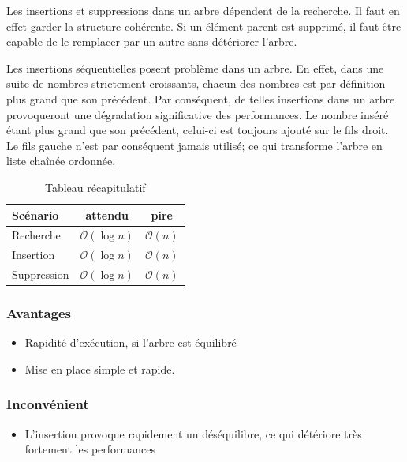 \documentclass[hidelinks,a4paper, 12pt]{article}
\begin{document}
	Les insertions et suppressions dans un arbre dépendent de la recherche. Il faut en effet garder la structure cohérente. Si un élément parent est supprimé, il faut être capable de le remplacer par un autre sans détériorer l'arbre.
	
	Les insertions séquentielles posent problème dans un arbre. En effet, dans une suite de nombres strictement croissants, chacun des nombres est par définition plus grand que son précédent. Par conséquent, de telles insertions dans un arbre provoqueront une dégradation significative des performances. Le nombre inséré étant plus grand que son précédent, celui-ci est toujours ajouté sur le fils droit. Le fils gauche n'est par conséquent jamais utilisé; ce qui transforme l'arbre en liste chaînée ordonnée.
	
	 \begin{table}[h]
	 	\begin{tabular}{|l|c|c|}
	 		\hline
	 		Scénario & attendu & pire \\
	 		\hline
	 		Recherche & $\mathcal{O}(\log n)$ & $\mathcal{O}(n)$ \\ 
	 		\hline
	 		Insertion & $\mathcal{O}(\log n)$ & $\mathcal{O}(n)$ \\
	 		\hline
	 		Suppression & $\mathcal{O}(\log n)$ & $\mathcal{O}(n)$\\
	 		\hline
	 	\end{tabular}
	 	\caption{Tableau récapitulatif}
	 \end{table}
	
	\subsubsection*{Avantages}
	\begin{itemize}
		\item Rapidité d'exécution, si l'arbre est équilibré
		\item Mise en place simple et rapide.
	\end{itemize}
	\subsubsection*{Inconvénient}
	\begin{itemize}
		\item L'insertion provoque rapidement un déséquilibre, ce qui détériore très fortement les performances
	\end{itemize}
\end{document}
